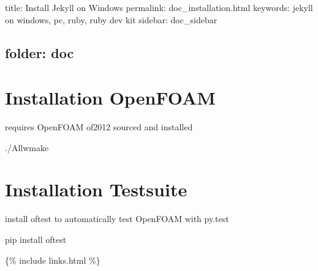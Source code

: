 

 title\+: Install Jekyll on Windows permalink\+: doc\+\_\+installation.\+html keywords\+: jekyll on windows, pc, ruby, ruby dev kit sidebar\+: doc\+\_\+sidebar \subsection*{folder\+: doc }

\section*{Installation Open\+F\+O\+AM}

requires Open\+F\+O\+AM of2012 sourced and installed


\begin{DoxyCode}
./Allwmake
\end{DoxyCode}
 \section*{Installation Testsuite}

install oftest to automatically test Open\+F\+O\+AM with py.\+test


\begin{DoxyCode}
pip install oftest
\end{DoxyCode}


\{\% include links.\+html \%\} 